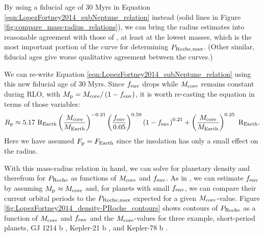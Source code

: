 \documentclass{svjour3}                     %
\begin{document}
By using a fiducial age of 30 Myrs in Equation \ref{eqn:LopezFortney2014_subNeptune_relation} instead (solid lines in Figure \ref{fig:compare_mass-radius_relations}), we can bring the radius estimates into reasonable agreement with those of \cite{2015ApJ...813..101V}, at least at the lowest masses, which is the most important portion of the curve for determining $P_{\rm Roche, max}$. (Other similar, fiducial ages give worse qualitative agreement between the curves.)

We can re-write Equation \ref{eqn:LopezFortney2014_subNeptune_relation} using this new fiducial age of 30 Myrs. Since $f_{\rm env}$ drops while $M_{\rm core}$ remains constant during RLO, with $M_{\rm p} = M_{\rm core}/\left(1 - f_{\rm env}\right)$, it is worth re-casting the equation in terms of those variables:
\begin{equation}
R_{\rm p} \approx 5.17\ {\rm R_{Earth}} \left( \dfrac{M_{\rm core}}{M_{\rm Earth}} \right)^{-0.21} \left( \dfrac{f_{\rm env}}{0.05} \right)^{0.59} \left( 1 - f_{\rm env} \right)^{0.21} + \left( \dfrac{M_{\rm core}}{M_{\rm Earth}} \right)^{0.25}\ {\rm R_{Earth}}.
\label{eqn:recast_LopezFortney2014_subNeptune_relation}
\end{equation}
Here we have assumed $F_{\rm p} = F_{\rm Earth}$ since the insolation has only a small effect on the radius.

With this mass-radius relation in hand, we can solve for planetary density and therefrom for $P_{\rm Roche}$ as functions of $M_{\rm core}$ and $f_{\rm env}$. As in \cite{Lopez2014Understanding}, we can estimate $f_{\rm env}$ by assuming $M_{\rm p} \approx M_{\rm core}$ and, for planets with small $f_{\rm env}$, we can compare their current orbital periods to the $P_{\rm Roche, max}$ expected for a given $M_{\rm core}$-value. Figure \ref{fig:LopezFortney2014_density-PRoche_contours} shows contours of $P_{\rm Roche}$ as a function of $M_{\rm core}$ and $f_{\rm env}$ and the $M_{\rm core}$-values for three example, short-period planets, GJ 1214 b \cite{2009Natur.462..891C}, Kepler-21 b \cite{2012ApJ...746..123H}, and Kepler-78 b \cite{2013ApJ...774...54S}. 
\end{document}

